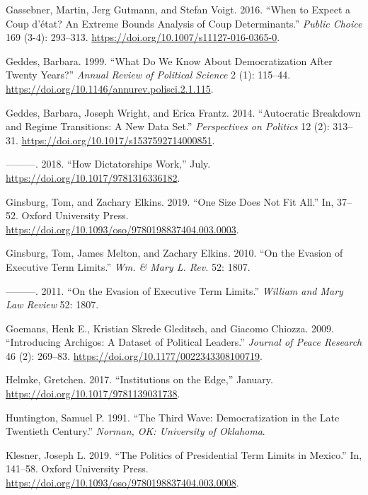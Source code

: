 \documentclass[
  12pt,
]{report}
\newlength{\cslhangindent}
\newenvironment{CSLReferences}[2] %
 {\begin{list}{}{%
  \setlength{\itemindent}{0pt}
  \setlength{\leftmargin}{0pt}
  \setlength{\parsep}{0pt}
  \ifodd #1
   \setlength{\leftmargin}{\cslhangindent}
   \setlength{\itemindent}{-1\cslhangindent}
  \fi
  \setlength{\itemsep}{#2\baselineskip}}}
 {\end{list}}
\begin{document}
\begin{CSLReferences}{1}{0}
Gassebner, Martin, Jerg Gutmann, and Stefan Voigt. 2016. {``When to
Expect a Coup d{'}état? An Extreme Bounds Analysis of Coup
Determinants.''} \emph{Public Choice} 169 (3-4): 293--313.
\url{https://doi.org/10.1007/s11127-016-0365-0}.

Geddes, Barbara. 1999. {``What Do We Know About Democratization After
Twenty Years?''} \emph{Annual Review of Political Science} 2 (1):
115--44. \url{https://doi.org/10.1146/annurev.polisci.2.1.115}.

Geddes, Barbara, Joseph Wright, and Erica Frantz. 2014. {``Autocratic
Breakdown and Regime Transitions: A New Data Set.''} \emph{Perspectives
on Politics} 12 (2): 313--31.
\url{https://doi.org/10.1017/s1537592714000851}.

---------. 2018. {``How Dictatorships Work,''} July.
\url{https://doi.org/10.1017/9781316336182}.

Ginsburg, Tom, and Zachary Elkins. 2019. {``One Size Does Not Fit
All.''} In, 37--52. Oxford University Press.
\url{https://doi.org/10.1093/oso/9780198837404.003.0003}.

Ginsburg, Tom, James Melton, and Zachary Elkins. 2010. {``On the Evasion
of Executive Term Limits.''} \emph{Wm. \& Mary L. Rev.} 52: 1807.

---------. 2011. {``On the Evasion of Executive Term Limits.''}
\emph{William and Mary Law Review} 52: 1807.

Goemans, Henk E., Kristian Skrede Gleditsch, and Giacomo Chiozza. 2009.
{``Introducing Archigos: A Dataset of Political Leaders.''}
\emph{Journal of Peace Research} 46 (2): 269--83.
\url{https://doi.org/10.1177/0022343308100719}.

Helmke, Gretchen. 2017. {``Institutions on the Edge,''} January.
\url{https://doi.org/10.1017/9781139031738}.

Huntington, Samuel P. 1991. {``The Third Wave: Democratization in the
Late Twentieth Century.''} \emph{Norman, OK: University of Oklahoma}.

Klesner, Joseph L. 2019. {``The Politics of Presidential Term Limits in
Mexico.''} In, 141--58. Oxford University Press.
\url{https://doi.org/10.1093/oso/9780198837404.003.0008}.


\end{CSLReferences}
\end{document}
